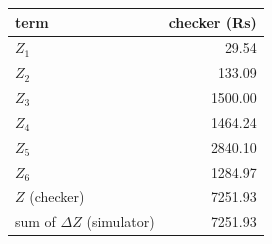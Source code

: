 \small\begin{tabular}{@{}lr@{}}\toprule term & checker (Rs) \\\midrule
$Z_1$ & 29.54 \\
$Z_2$ & 133.09 \\
$Z_3$ & 1500.00 \\
$Z_4$ & 1464.24 \\
$Z_5$ & 2840.10 \\
$Z_6$ & 1284.97 \\
\midrule $Z$ (checker) & 7251.93 \\
 sum of $\Delta Z$ (simulator) & 7251.93 \\
\bottomrule\end{tabular}
